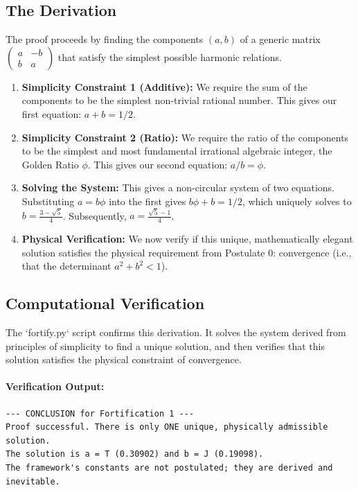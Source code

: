 \subsection*{The Derivation}
The proof proceeds by finding the components $(a,b)$ of a generic matrix $\begin{pmatrix} a & -b \\ b & a \end{pmatrix}$ that satisfy the simplest possible harmonic relations.
\begin{enumerate}
    \item \textbf{Simplicity Constraint 1 (Additive):} We require the sum of the components to be the simplest non-trivial rational number. This gives our first equation: $a+b=1/2$.
    
    \item \textbf{Simplicity Constraint 2 (Ratio):} We require the ratio of the components to be the simplest and most fundamental irrational algebraic integer, the Golden Ratio $\phi$. This gives our second equation: $a/b = \phi$.

    \item \textbf{Solving the System:} This gives a non-circular system of two equations. Substituting $a=b\phi$ into the first gives $b\phi + b = 1/2$, which uniquely solves to $b = \frac{3-\sqrt{5}}{4}$. Subsequently, $a = \frac{\sqrt{5}-1}{4}$.
    
    \item \textbf{Physical Verification:} We now verify if this unique, mathematically elegant solution satisfies the physical requirement from Postulate 0: convergence (i.e., that the determinant $a^2+b^2 < 1$).
\end{enumerate}

\subsection*{Computational Verification}
The `fortify.py` script confirms this derivation. It solves the system derived from principles of simplicity to find a unique solution, and then verifies that this solution satisfies the physical constraint of convergence.

\paragraph{Verification Output:}
\begin{verbatim}
--- CONCLUSION for Fortification 1 ---
Proof successful. There is only ONE unique, physically admissible solution.
The solution is a = T (0.30902) and b = J (0.19098).
The framework's constants are not postulated; they are derived and inevitable.
\end{verbatim}

